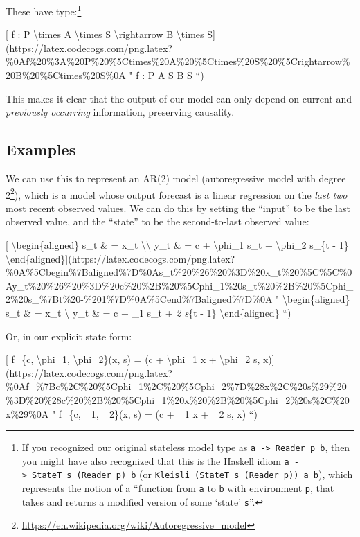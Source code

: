 \documentclass[]{article}
\renewcommand{\href}[2]{#2\footnote{\url{#1}}}
\begin{document}
These have type:\footnote{If you recognized our original stateless model type as
  \texttt{a\ -\textgreater{}\ Reader\ p\ b}, then you might have also recognized
  that this is the Haskell idiom
  \texttt{a\ -\textgreater{}\ StateT\ s\ (Reader\ p)\ b} (or
  \texttt{Kleisli\ (StateT\ s\ (Reader\ p))\ a\ b}), which represents the notion
  of a ``function from \texttt{a} to \texttt{b} with environment \texttt{p},
  that takes and returns a modified version of some `state' \texttt{s}''.}

{[} f : P \textbackslash{}times A \textbackslash{}times S
\textbackslash{}rightarrow B \textbackslash{}times
S{]}(https://latex.codecogs.com/png.latex?\%0Af\%20\%3A\%20P\%20\%5Ctimes\%20A\%20\%5Ctimes\%20S\%20\%5Crightarrow\%20B\%20\%5Ctimes\%20S\%0A
" f : P \times A \times S \rightarrow B \times S ``)

This makes it clear that the output of our model can only depend on current and
\emph{previously occurring} information, preserving causality.

\hypertarget{examples}{%
\subsection{Examples}\label{examples}}

We can use this to represent an AR(2) model
(\href{https://en.wikipedia.org/wiki/Autoregressive_model}{autoregressive model
with degree 2}), which is a model whose output forecast is a linear regression
on the \emph{last two} most recent observed values. We can do this by setting
the ``input'' to be the last observed value, and the ``state'' to be the
second-to-last observed value:

{[} \textbackslash{}begin\{aligned\} s\_t \& = x\_t
\textbackslash{}\textbackslash{} y\_t \& = c + \textbackslash{}phi\_1 s\_t +
\textbackslash{}phi\_2 s\_\{t - 1\}
\textbackslash{}end\{aligned\}{]}(https://latex.codecogs.com/png.latex?\%0A\%5Cbegin\%7Baligned\%7D\%0As\_t\%20\%26\%20\%3D\%20x\_t\%20\%5C\%5C\%0Ay\_t\%20\%26\%20\%3D\%20c\%20\%2B\%20\%5Cphi\_1\%20s\_t\%20\%2B\%20\%5Cphi\_2\%20s\_\%7Bt\%20-\%201\%7D\%0A\%5Cend\%7Baligned\%7D\%0A
" \textbackslash{}begin\{aligned\} s\_t \& = x\_t \textbackslash{} y\_t \& = c +
\phi\_1 s\_t + \phi\emph{2 s}\{t - 1\} \textbackslash{}end\{aligned\} ``)

Or, in our explicit state form:

{[} f\_\{c, \textbackslash{}phi\_1, \textbackslash{}phi\_2\}(x, s) = (c +
\textbackslash{}phi\_1 x + \textbackslash{}phi\_2 s,
x){]}(https://latex.codecogs.com/png.latex?\%0Af\_\%7Bc\%2C\%20\%5Cphi\_1\%2C\%20\%5Cphi\_2\%7D\%28x\%2C\%20s\%29\%20\%3D\%20\%28c\%20\%2B\%20\%5Cphi\_1\%20x\%20\%2B\%20\%5Cphi\_2\%20s\%2C\%20x\%29\%0A
" f\_\{c, \phi\_1, \phi\_2\}(x, s) = (c + \phi\_1 x + \phi\_2 s, x) ``)
\end{document}
